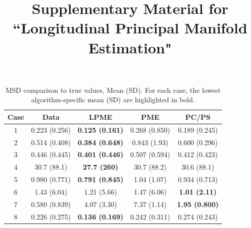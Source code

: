 \documentclass[12pt]{article}
\begin{document}
\title{\bf{Supplementary Material for ``Longitudinal Principal Manifold Estimation"}}
\author{}

\maketitle

\renewcommand\thefigure{S\arabic{figure}}
\renewcommand\thetable{S\arabic{table}}

\setcounter{figure}{0}
\setcounter{table}{0}

\begin{table}[h]
  \centering
  \begin{tabular}{|c c c c c|}
    \hline
    Case & Data & LPME & PME & PC/PS \\
    \hline
    1 & 0.223 (0.256) & {\bf 0.125 (0.161)} & 0.268 (0.850) & 0.189 (0.245) \\
    2 & 0.514 (0.408) & {\bf 0.384 (0.648)} & 0.843 (1.93) & 0.600 (0.296) \\
    3 & 0.446 (0.445) & {\bf 0.401 (0.446)} & 0.507 (0.594) & 0.412 (0.423) \\
    4 & 30.7 (88.1) & {\bf 27.7 (260)} & 30.7 (88.2) & 30.6 (88.1) \\
    5 & 0.980 (0.771) & {\bf 0.791 (0.845)} & 1.04 (1.07) & 0.934 (0.713) \\
    6 & 1.43 (6.04) & 1.21 (5.66) & 1.47 (6.06) & {\bf 1.01 (2.11)} \\
    7 & 0.580 (0.839) & 4.07 (3.30) & 7.37 (1.14) & {\bf 1.95 (0.800)} \\
    8 & 0.226 (0.275) & {\bf 0.136 (0.169)} & 0.242 (0.311) & 0.274 (0.243) \\
    \hline
  \end{tabular}
  \caption{MSD comparison to true values, Mean (SD). For each case, the lowest algorithm-specific mean (SD) are highlighted in bold. }
  \label{table:simulation_results_mean}
\end{table}
\end{document}
